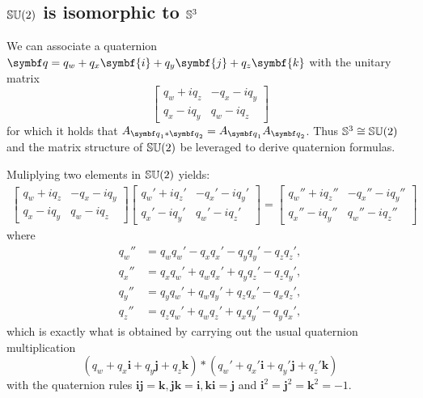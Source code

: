 \subsection{\texorpdfstring{${\mathbb{SU}(2)}$}{SU(2)} is isomorphic to \texorpdfstring{${\mathbb{S}^3}$}{S3}}

We can associate a quaternion $\bq = q_w + q_x \symbf{i} + q_y \symbf{j} + q_z \symbf{k}$ with the unitary matrix
\begin{equation}
  \begin{bmatrix}
    q_w + i q_z & -q_x - i q_y \\
    q_x - i q_y & q_w - i q_z
  \end{bmatrix}
\end{equation}
for which it holds that $A_{\bq_1 * \bq_2} = A_{\bq_1} A_{\bq_2}$. Thus ${\mathbb{S}^3} \cong {\mathbb{SU}(2)}$ and the matrix structure of ${\mathbb{SU}(2)}$ be leveraged to derive quaternion formulas.

Muliplying two elements in ${\mathbb{SU}(2)}$ yields:
\begin{equation}
  \begin{aligned}
    \begin{bmatrix}
      q_w + i q_z & -q_x - i q_y \\
      q_x - i q_y & q_w - i q_z
    \end{bmatrix} \begin{bmatrix}
      q_w' + i q_z' & -q_x' - i q_y' \\
      q_x' - i q_y' & q_w' - i q_z'
    \end{bmatrix}
    = \begin{bmatrix}
      q_w'' + i q_z'' & -q_x'' - i q_y'' \\
      q_x'' - i q_y'' & q_w'' - i q_z''
    \end{bmatrix}
  \end{aligned}
\end{equation}
where
\begin{equation}
  \label{eq:quaternion_composition}
  \begin{aligned}
    q_w'' & = q_w q_w' - q_x q_x' - q_y q_y' - q_z q_z', \\
    q_x'' & = q_x q_w' + q_w q_x' + q_y q_z' - q_z q_y', \\
    q_y'' & = q_y q_w' + q_w q_y' + q_z q_x' - q_x q_z', \\
    q_z'' & = q_z q_w' + q_w q_z' + q_x q_y' - q_y q_x',
  \end{aligned}
\end{equation}
which is exactly what is obtained by carrying out the usual quaternion multiplication
\begin{equation}
  (q_w + q_x \symbf{i} + q_y \symbf{j} + q_z \symbf{k}) * (q_w' + q_x' \symbf{i} + q_y' \symbf{j} + q_z' \symbf{k})
\end{equation}
with the quaternion rules $\symbf{i}\symbf{j} = \symbf{k}, \symbf{j}\symbf{k} = \symbf{i}, \symbf{k}\symbf{i} = \symbf{j}$ and $\symbf{i}^2 = \symbf{j}^2 = \symbf{k}^2 = -1$.


